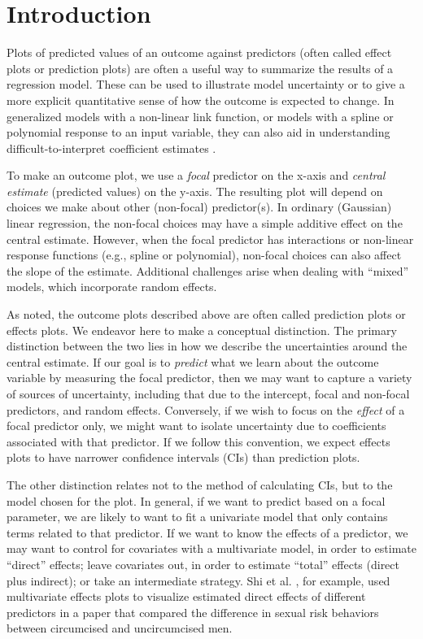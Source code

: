 
\linenumbers

\section{Introduction}

Plots of predicted values of an outcome against predictors (often called effect plots or prediction plots) are often a useful way to summarize the results of a regression model. These can be used to illustrate model uncertainty or to give a more explicit quantitative sense of how the outcome is expected to change. In generalized models with a non-linear link function, or models with a spline or polynomial response to an input variable, they can also aid in understanding difficult-to-interpret coefficient estimates \citep{brambor_understanding_2006, berry_improving_2012, leeper2017interpreting}. 

To make an outcome plot, we use a \emph{focal} predictor on the x-axis and \emph{central estimate} (predicted values) on the y-axis. The resulting plot will depend on choices we make about other (non-focal) predictor(s). In ordinary (Gaussian) linear regression, the non-focal choices may have a simple additive effect on the central estimate. However, when the focal predictor has interactions or non-linear response functions (e.g., spline or polynomial), non-focal choices can also affect the slope of the estimate. Additional challenges arise when dealing with “mixed” models, which incorporate random effects.

As noted, the outcome plots described above are often called prediction plots or effects plots. We endeavor here to make a conceptual distinction. 
The primary distinction between the two lies in how we describe the uncertainties around the central estimate. 
If our goal is to \emph{predict} what we learn about the outcome variable by measuring the focal predictor, then we may want to capture a variety of sources of uncertainty, including that due to the intercept, focal and non-focal predictors, and random effects.
Conversely, if we wish to focus on the \emph{effect} of a focal predictor only, we might want to isolate uncertainty due to coefficients associated with that predictor.
If we follow this convention, we expect effects plots to have narrower confidence intervals (CIs) than prediction plots.

The other distinction relates not to the method of calculating CIs, but to the model chosen for the plot. 
In general, if we want to predict based on a focal parameter, we are likely to want to fit a univariate model that only contains terms related to that predictor.
If we want to know the effects of a predictor, we may want to control for covariates with a multivariate model, in order to estimate “direct” effects; leave covariates out, in order to estimate “total” effects (direct plus indirect); or take an intermediate strategy.
Shi et al. \citep{shi_evidence_2017}, for example, used multivariate effects plots to visualize estimated direct effects of different predictors in a paper that compared the difference in sexual risk behaviors between circumcised and uncircumcised men.

